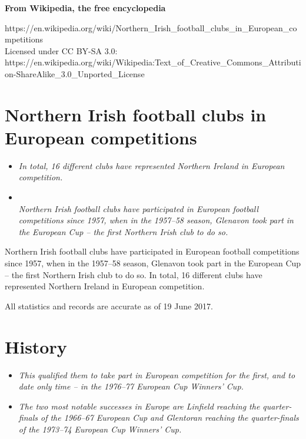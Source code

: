 \textbf{From Wikipedia, the free encyclopedia}

https://en.wikipedia.org/wiki/Northern\_Irish\_football\_clubs\_in\_European\_competitions\\
Licensed under CC BY-SA 3.0:\\
https://en.wikipedia.org/wiki/Wikipedia:Text\_of\_Creative\_Commons\_Attribution-ShareAlike\_3.0\_Unported\_License

\section{Northern Irish football clubs in European
competitions}\label{northern-irish-football-clubs-in-european-competitions}

\begin{itemize}
\item
  \emph{In total, 16 different clubs have represented Northern Ireland
  in European competition.}
\item
  \emph{\\[3\baselineskip]Northern Irish football clubs have
  participated in European football competitions since 1957, when in the
  1957--58 season, Glenavon took part in the European Cup -- the first
  Northern Irish club to do so.}
\end{itemize}

Northern Irish football clubs have participated in European football
competitions since 1957, when in the 1957--58 season, Glenavon took part
in the European Cup -- the first Northern Irish club to do so. In total,
16 different clubs have represented Northern Ireland in European
competition.

All statistics and records are accurate as of 19 June 2017.

\section{History}\label{history}

\begin{itemize}
\item
  \emph{This qualified them to take part in European competition for the
  first, and to date only time -- in the 1976--77 European Cup Winners'
  Cup.}
\item
  \emph{The two most notable successes in Europe are Linfield reaching
  the quarter-finals of the 1966--67 European Cup and Glentoran reaching
  the quarter-finals of the 1973--74 European Cup Winners' Cup.}
\end{itemize}

